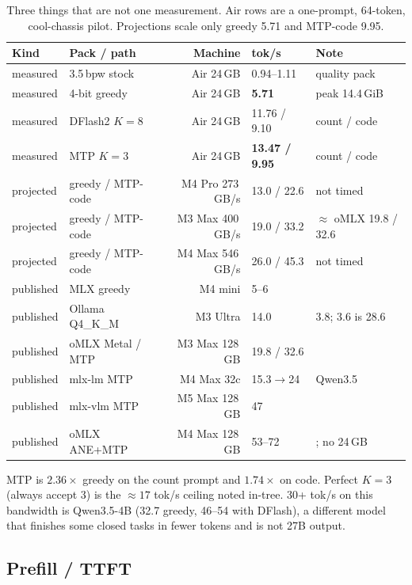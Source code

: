 \begin{table}[t]
\centering
\caption{Three things that are not one measurement. Air rows are a one-prompt, 64-token, cool-chassis pilot. Projections scale only greedy 5.71 and MTP-code 9.95.}
\label{tab:27b}
\scriptsize
\begin{tabular}{@{}llrll@{}}
\toprule
Kind & Pack / path & Machine & tok/s & Note \\
\midrule
measured & 3.5\,bpw stock & Air 24\,GB & 0.94--1.11 & quality pack \\
measured & 4-bit greedy & Air 24\,GB & \textbf{5.71} & peak 14.4\,GiB \\
measured & DFlash2 $K{=}8$ & Air 24\,GB & 11.76 / 9.10 & count / code \\
measured & MTP $K{=}3$ & Air 24\,GB & \textbf{13.47 / 9.95} & count / code \\
\midrule
projected & greedy / MTP-code & M4 Pro 273\,GB/s & 13.0 / 22.6 & not timed \\
projected & greedy / MTP-code & M3 Max 400\,GB/s & 19.0 / 33.2 & $\approx$ oMLX 19.8 / 32.6 \\
projected & greedy / MTP-code & M4 Max 546\,GB/s & 26.0 / 45.3 & not timed \\
\midrule
published & MLX greedy & M4 mini & 5--6 & \citet{orcarouter2026} \\
published & Ollama Q4\_K\_M & M3 Ultra & 14.0 & 3.8; 3.6 is 28.6 \\
published & oMLX Metal / MTP & M3 Max 128\,GB & 19.8 / 32.6 & \citet{omlx2874} \\
published & mlx-lm MTP & M4 Max 32c & 15.3$\to$24 & Qwen3.5~\citep{mlxlm990} \\
published & mlx-vlm MTP & M5 Max 128\,GB & 47 & \citet{nathanmaine} \\
published & oMLX ANE+MTP & M4 Max 128\,GB & 53--72 & \citet{weschera2026}; no 24\,GB \\
\bottomrule
\end{tabular}
\end{table}

MTP is $2.36\times$ greedy on the count prompt and $1.74\times$ on code. Perfect $K{=}3$ (always accept 3) is the $\approx 17$ tok/s ceiling noted in-tree. 30+ tok/s on this bandwidth is Qwen3.5-4B (32.7 greedy, 46--54 with DFlash), a different model that finishes some closed tasks in fewer tokens and is not 27B output.

\subsection{Prefill / TTFT}

